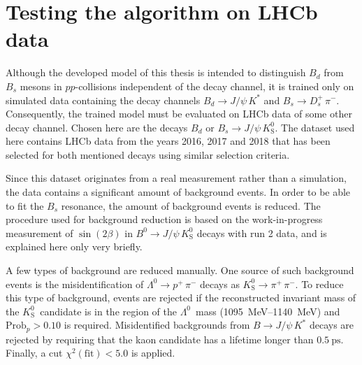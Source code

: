 \section{Testing the algorithm on LHCb data}



Although the developed model of this thesis is intended to distinguish $B_d$ from $B_s$ mesons in $pp$-collisions independent of the decay channel, it is trained only on simulated data containing the decay channels $B_d \rightarrow J/\psi \, K^*$ and $B_s \rightarrow D^+_s \, \pi^-$.
Consequently, the trained model must be evaluated on LHCb data of some other decay channel.
Chosen here are the decays $B_d \text{ or } B_s \rightarrow J/\psi \, K^0_\text{S}$.
The dataset used here contains LHCb data from the years 2016, 2017 and 2018 that has been selected for both mentioned decays using similar selection criteria. 

Since this dataset originates from a real measurement rather than a simulation, the data contains a significant amount of background events.
In order to be able to fit the $B_s$ resonance, the amount of background events is reduced.
The procedure used for background reduction is based on the work-in-progress measurement of $\sin(2\beta)$ in $B^0\rightarrow J/\psi \, K^0_\text{S}$ decays with run 2 data, and is explained here only very briefly.

A few types of background are reduced manually.
One source of such background events is the misidentification of $\Lambda^0 \rightarrow p^+ \, \pi^-$ decays as $K^0_\text{S} \rightarrow \pi^+ \, \pi^-$.
To reduce this type of background, events are rejected if the reconstructed invariant mass of the $K^0_\text{S}$~candidate is in the region  of the $\Lambda^0$~mass (\qtyrange{1095}{1140}{\MeV}) and $\text{Prob}_p > \num{0.10}$ is required. 
Misidentified backgrounds from $B \rightarrow J/\psi \, K^*$ decays are rejected by requiring that the kaon candidate has a lifetime longer than $\qty{0.5}{\pico\second}$.
Finally, a cut $\chi^2(\text{fit})<\num{5.0}$ is applied. %

